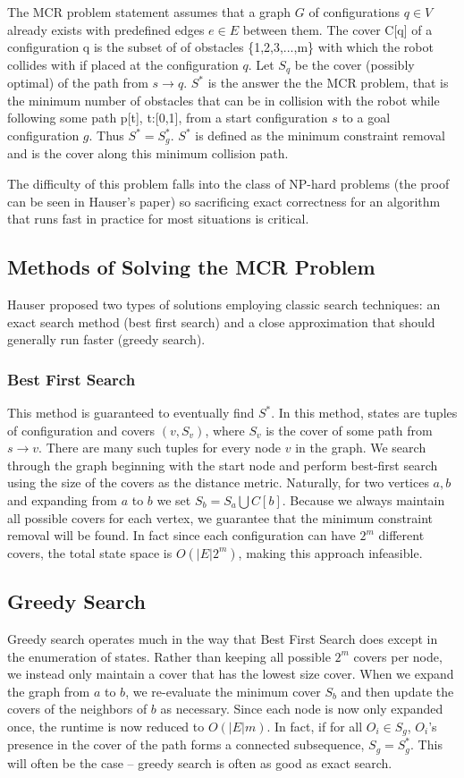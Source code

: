 The MCR problem statement assumes that a graph $G$ of configurations $q \in V$ already exists with predefined edges $e \in E$ between them. The cover C[q] of a configuration q is the subset of of obstacles \{1,2,3,...,m\} with which the robot collides with if placed at the configuration $q$. Let $S_q$ be the cover (possibly optimal) of the path from $s \rightarrow q$. $S^{*}$ is the answer the the MCR problem, that is the minimum number of obstacles that can be in collision with the robot while following some path p[t], t:[0,1], from a start configuration $s$ to a goal configuration $g$. Thus $S^{*} = S^{*}_g$. $S^{*}$ is defined as the minimum constraint removal and is the cover along this minimum collision path. 

The difficulty of this problem falls into the class of NP-hard problems (the proof can be seen in Hauser's paper) so sacrificing exact correctness for an algorithm that runs fast in practice for most situations is critical. 

\subsection{Methods of Solving the MCR Problem}
Hauser proposed two types of solutions employing classic search techniques: an exact search method (best first search) and a close approximation that should generally run faster (greedy search).

\subsubsection{Best First Search}
This method is guaranteed to eventually find $S^{*}$. In this method, states are tuples of configuration and covers $(v, S_v)$, where $S_v$ is the cover of some path from $s \rightarrow v$. There are many such tuples for every node $v$ in the graph. We search through the graph beginning with the start node and perform best-first search using the size of the covers as the distance metric. Naturally, for two vertices $a, b$ and expanding from $a$ to $b$ we set $S_b = S_a \bigcup C[b]$. Because we always maintain all possible covers for each vertex, we guarantee that the minimum constraint removal will be found. In fact since each configuration can have $2^m$ different covers, the total state space is $O(|E|2^m)$, making this approach infeasible.

\subsection{Greedy Search}
Greedy search operates much in the way that Best First Search does except in the enumeration of states. Rather than keeping all possible $2^m$ covers per node, we instead only maintain a cover that has the lowest size cover. When we expand the graph from $a$ to $b$, we re-evaluate the minimum cover $S_b$ and then update the covers of the neighbors of $b$ as necessary. Since each node is now only expanded once, the runtime is now reduced to $O(|E|m)$. In fact, if for all $O_i \in S_g$, $O_i$'s presence in the cover of the path forms a connected subsequence, $S_g = S^{*}_g$. This will often be the case -- greedy search is often as good as exact search.

